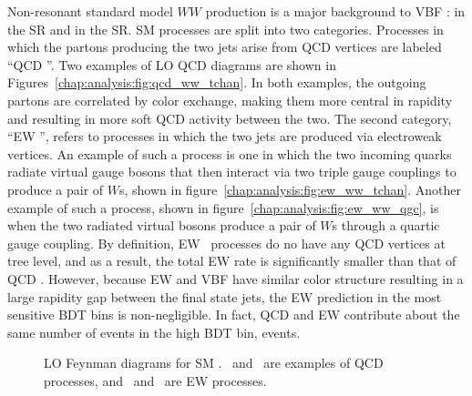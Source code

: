 
Non-resonant standard model $WW$ production is a major background to
VBF \hww:  in the \emme SR and  in
the \eemm SR. SM \wwtwoj processes are split into two
categories. Processes in which the partons producing the two jets
arise from QCD vertices are labeled ``QCD \ww''. Two examples of LO QCD \ww
diagrams are shown in
Figures~\ref{chap:analysis:fig:qcd_ww_tchan}. In
both examples, the outgoing partons are correlated by color exchange,
making them more central in rapidity and resulting in more soft QCD
activity between the two. The second category, ``EW \ww'', refers
to processes in which the two jets are produced via electroweak
vertices. An example of such a process is one in which the two
incoming quarks radiate virtual gauge bosons that then interact via
two triple gauge couplings to produce a pair of $W$s, shown in
figure~\ref{chap:analysis:fig:ew_ww_tchan}. Another example of such a
process, shown in figure~\ref{chap:analysis:fig:ew_ww_qgc}, is when the
two radiated virtual bosons produce a pair of $W$s through a quartic
gauge coupling. By definition, EW \ww~processes do no have any QCD
vertices at tree level, and as a result, the total EW \ww rate is
significantly smaller than that of QCD \ww. However, because EW \ww
and VBF \hww have similar color structure resulting in a large rapidity
gap between the final state jets, the EW \ww prediction in the most
sensitive BDT bins is non-negligible. In fact, QCD and EW \ww contribute about the same
number of events in the high BDT bin,  events. 

\begin{figure}[h]
    \centering
    \caption[LO Feynman diagrams for SM \ww.]{LO Feynman diagrams for
    SM \ww.~
    and~ are examples of
    QCD \ww processes, and~
    and~ are EW \ww processes.}
\label{chap:analysis:fig:ww_feyn_diag}
\end{figure}

